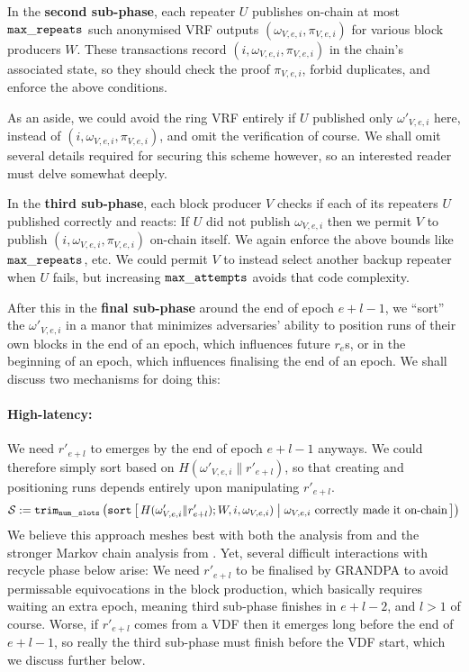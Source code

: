 In the {\bf second sub-phase}, each repeater $U$ publishes on-chain at most $\mathtt{max\_repeats}$ such anonymised VRF outputs $(\omega_{V,e,i},\pi_{V,e,i})$ for various block producers $W$.  These transactions record $(i,\omega_{V,e,i},\pi_{V,e,i})$ in the chain's associated state, so they should check the proof $\pi_{V,e,i}$, forbid duplicates, and enforce the above conditions.

As an aside, we could avoid the ring VRF entirely if $U$ published only $\omega'_{V,e,i}$ here, instead of $(i,\omega_{V,e,i},\pi_{V,e,i})$, and omit the verification of course.  We shall omit several details required for securing this scheme however, so an interested reader must delve somewhat deeply.

In the {\bf third sub-phase}, each block producer $V$ checks if each of its repeaters $U$ published correctly and reacts:  If $U$ did not publish $\omega_{V,e,i}$ then we permit $V$ to publish $(i,\omega_{V,e,i},\pi_{V,e,i})$ on-chain itself.  We again enforce the above bounds like $\mathtt{max\_repeats}$, etc.  We could permit $V$ to instead select another backup repeater when $U$ fails, but increasing $\mathtt{max\_attempts}$ avoids that code complexity.

After this in the {\bf final sub-phase} around the end of epoch $e+l-1$, we ``sort'' the $\omega'_{V,e,i}$ in a manor that minimizes adversaries' ability to position runs of their own blocks in the end of an epoch, which influences future $r_e$s, or in the beginning of an epoch, which influences finalising the end of an epoch.  We shall discuss two mechanisms for doing this: 

\paragraph{High-latency:} 
We need $r'_{e+l}$ to emerges by the end of epoch $e+l-1$ anyways.  We could therefore simply sort based on $H(\omega'_{V,e,i} \| r'_{e+l})$, so that creating and positioning runs depends entirely upon manipulating $r'_{e+l}$. 
$$ \mathcal{S} := \mathtt{trim}_\vrfaslotsbound\left( \mathtt{sort} \Listst{
  H(\omega'_{V,e,i} \| r'_{e+l}); W,i,\omega_{V,e,i}) 
}{
  \omega_{V,e,i} \text{ correctly made it on-chain}
} \right) $$
We believe this approach meshes best with both the analysis from \cite{Praos} and the stronger Markov chain analysis from \cite{Kiffer18}.  Yet, several difficult interactions with recycle phase below arise:  We need $r'_{e+l}$ to be finalised by GRANDPA to avoid permissable equivocations in the block production, which basically requires waiting an extra epoch, meaning third sub-phase finishes in $e+l-2$, and $l>1$ of course.  Worse, if $r'_{e+l}$ comes from a VDF then it emerges long before the end of $e+l-1$, so really the third sub-phase must finish before the VDF start, which we discuss further below.

